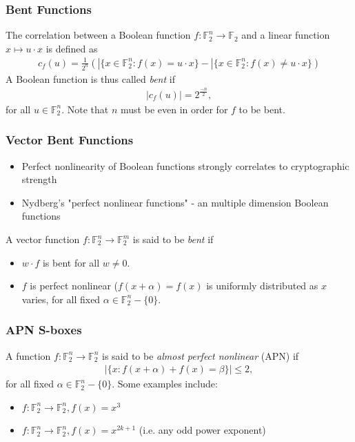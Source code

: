 \documentclass[handout]{beamer}
\newcommand{\field}[1]{\mathbb{#1}} %
\begin{document}
\begin{frame}
	\frametitle{Bent Functions}
	The correlation between a Boolean function $f : \field{F}_2^n \to \field{F}_2$ and a linear function $x \mapsto u \cdot x$ is defined as
	\begin{eqnarray*}
	c_f(u) = \frac{1}{2^n}(|\{x \in \field{F}_2^n : f(x) = u \cdot x\} - |\{x \in \field{F}_2^n : f(x) \not= u \cdot x\})
	\end{eqnarray*}
	A Boolean function is thus called \emph{bent} if
	\begin{eqnarray*}
		|c_f(u)| = 2^{\frac{-n}{2}},
	\end{eqnarray*}
	for all $u \in \field{F}_2^n$. Note that $n$ must be even in order for $f$ to be bent.
\end{frame}

\begin{frame}
	\frametitle{Vector Bent Functions}
	\begin{itemize}
		\item Perfect nonlinearity of Boolean functions strongly correlates to cryptographic strength
		\item Nydberg's "perfect nonlinear functions" - an multiple dimension Boolean functions
	\end{itemize}
	A vector function $f : \field{F}_2^n \to \field{F}_2^m$ is said to be \emph{bent} if
	\begin{itemize}
		\item $w \cdot f$ is bent for all $w \not= 0$.
		\item $f$ is perfect nonlinear ($f(x + \alpha) = f(x)$ is uniformly distributed as $x$ varies, for all fixed $\alpha \in \field{F}_2^n - \{0\}$.
	\end{itemize}
\end{frame}

\begin{frame}
	\frametitle{APN S-boxes}
	A function $f : \field{F}_2^n \to \field{F}_2^n$ is said to be \emph{almost perfect nonlinear} (APN) if
	\begin{eqnarray*}
		|\{x : f(x + \alpha) + f(x) = \beta\}| \leq 2,
	\end{eqnarray*}
	for all fixed $\alpha \in \field{F}_2^n - \{0\}$. Some examples include:
	\begin{itemize}
		\item $f : \field{F}_2^n \to \field{F}_2^n, f(x) = x^3$
		\item $f : \field{F}_2^n \to \field{F}_2^n, f(x) = x^{2k + 1}$ (i.e. any odd power exponent)
	\end{itemize}
\end{frame}
\end{document}
